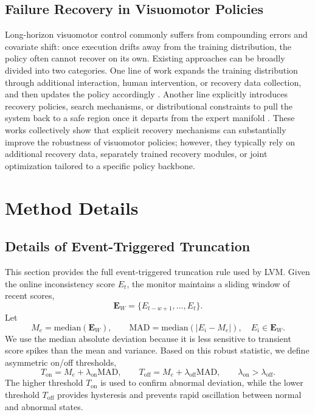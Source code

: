 \subsection{Failure Recovery in Visuomotor Policies}
Long-horizon visuomotor control commonly suffers from compounding errors and covariate shift: once execution drifts away from the training distribution, the policy often cannot recover on its own. Existing approaches can be broadly divided into two categories. One line of work expands the training distribution through additional interaction, human intervention, or recovery data collection, and then updates the policy accordingly \cite{sharma2023self,ingelhag2025real,hu2025rac,neary2025improving}. Another line explicitly introduces recovery policies, search mechanisms, or distributional constraints to pull the system back to a safe region once it departs from the expert manifold \cite{gao2025out,sun2025latent,jain2025smooth,liang2026adaptive,gou2024learning,wu2026speedup,xuvla}. These works collectively show that explicit recovery mechanisms can substantially improve the robustness of visuomotor policies; however, they typically rely on additional recovery data, separately trained recovery modules, or joint optimization tailored to a specific policy backbone.


\section{Method Details}
\label{app:method_details}

\subsection{Details of Event-Triggered Truncation}
\label{app:event_trigger_details}

This section provides the full event-triggered truncation rule used by LVM. Given the online inconsistency score $E_t$, the monitor maintains a sliding window of recent scores,
\[
\mathbf{E}_W=\{E_{t-w+1},\dots,E_t\}.
\]
Let
\[
M_e=\mathrm{median}(\mathbf{E}_W),
\qquad
\mathrm{MAD}=\mathrm{median}\!\left(|E_i-M_e|\right),\quad E_i\in\mathbf{E}_W .
\]
We use the median absolute deviation because it is less sensitive to transient score spikes than the mean and variance. Based on this robust statistic, we define asymmetric on/off thresholds,
\[
T_{\mathrm{on}}=M_e+\lambda_{\mathrm{on}}\mathrm{MAD},
\qquad
T_{\mathrm{off}}=M_e+\lambda_{\mathrm{off}}\mathrm{MAD},
\qquad
\lambda_{\mathrm{on}}>\lambda_{\mathrm{off}}.
\]
The higher threshold $T_{\mathrm{on}}$ is used to confirm abnormal deviation, while the lower threshold $T_{\mathrm{off}}$ provides hysteresis and prevents rapid oscillation between normal and abnormal states.

